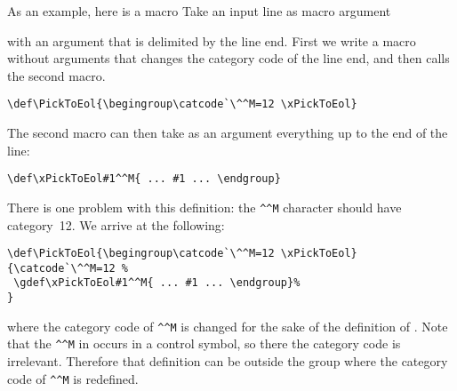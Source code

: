 As an example, here is
a macro \label{pick:eol}
\howto Take an input line as macro argument\par
with an argument that is delimited by the line end.
First we write a macro without arguments that 
changes the category code of the line end, and then
calls the second macro.
\begin{verbatim}
\def\PickToEol{\begingroup\catcode`\^^M=12 \xPickToEol}
\end{verbatim}
The second macro can then take as an argument everything
up to the end of the line:
\begin{verbatim}
\def\xPickToEol#1^^M{ ... #1 ... \endgroup}
\end{verbatim}
There is one problem with this definition: the \verb>^^M> character
should have category~12. We arrive at the following:
\begin{verbatim}
\def\PickToEol{\begingroup\catcode`\^^M=12 \xPickToEol}
{\catcode`\^^M=12 %
 \gdef\xPickToEol#1^^M{ ... #1 ... \endgroup}%
}
\end{verbatim}
where the category code of \verb>^^M> is changed for the
sake of the definition of . Note that
the \verb>^^M> in  occurs in a control symbol,
so there the category code  is irrelevant. Therefore that
definition can be outside the group where the category code 
of \verb>^^M> is redefined.


